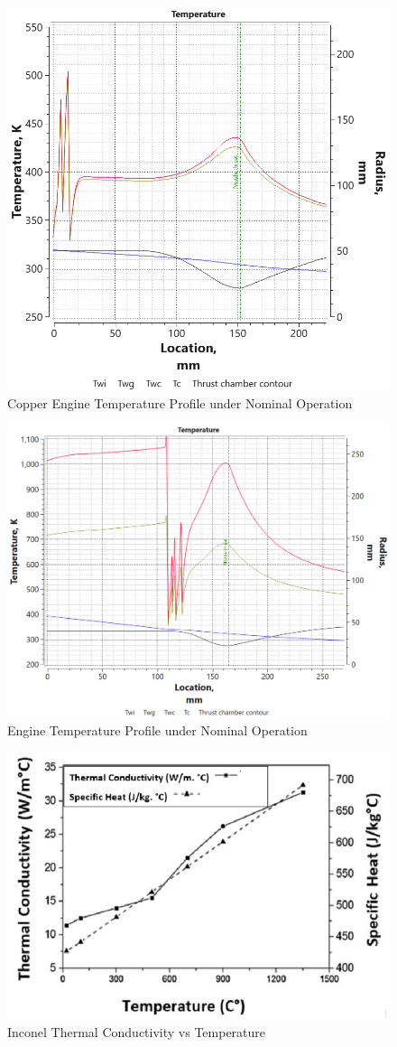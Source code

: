 \begin{figure}
    \centering
    \includegraphics[width=0.75\linewidth]{tempfinal_CUzn_5film.png}
    \caption{Copper Engine Temperature Profile under Nominal Operation}
    \label{fig:enter-label}
\end{figure}
\begin{figure}[H]
    \centering
    \includegraphics[width=0.75\linewidth]{Images/inconelenginetemps.png}
    \caption{Engine Temperature Profile under Nominal Operation}
    \label{fig:inconel_temp_profile}
\end{figure}

\begin{figure}[H]
    \centering
    \includegraphics[width=0.75\linewidth]{Images/inconelthermalconductivity.png}
    \caption{Inconel Thermal Conductivity vs Temperature}
    \label{fig:inconel_thermal_conductivity}
\end{figure}

